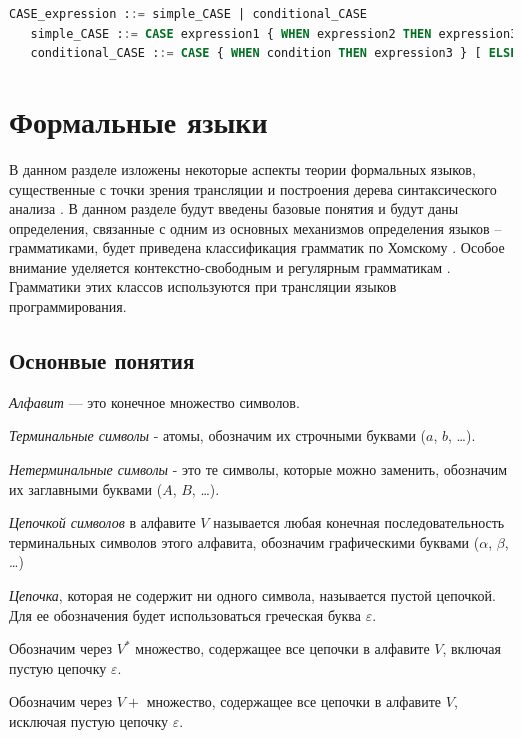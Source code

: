 \begin{lstlisting}[language=sql, label=some-code, caption=Спецификация SQL запроса]
   CASE_expression ::= simple_CASE | conditional_CASE
   simple_CASE ::= CASE expression1 { WHEN expression2 THEN expression3 } [ ELSE expression4 ] END
   conditional_CASE ::= CASE { WHEN condition THEN expression3 } [ ELSE expression4 ] END
\end{lstlisting}


\section{Формальные языки}

В данном разделе изложены некоторые аспекты теории формальных языков, существенные с точки зрения трансляции и построения дерева синтаксического анализа \cite{bib19}. 
В данном разделе будут введены базовые понятия и будут даны определения, связанные с одним из основных механизмов определения языков -- грамматиками, будет приведена
классификация грамматик по Хомскому \cite{bib20}.
Особое внимание уделяется контекстно-свободным и регулярным грамматикам \cite{bib21}. 
Грамматики этих классов используются при трансляции языков программирования. 

\subsection{Оснонвые понятия}

\textit{Алфавит} — это конечное множество символов.

\textit{Терминальные символы} - атомы, обозначим их строчными буквами ($a$, $b$, \dots).

\textit{Нетерминальные символы} -  это те символы, которые можно заменить, обозначим их заглавными буквами ($A$, $B$, \dots). 

\textit{Цепочкой символов} в алфавите $V$ называется любая конечная последовательность 
терминальных символов этого алфавита, обозначим графическими буквами ($\alpha$, $\beta$, \dots ) 

\textit{Цепочка}, которая не содержит ни одного символа, называется пустой цепочкой. 
Для ее обозначения будет использоваться греческая буква $\varepsilon$.

Обозначим через $V^{*}$ множество, содержащее все цепочки в алфавите
$V$, включая пустую цепочку $\varepsilon$.

Обозначим через $V{+}$ множество, содержащее все цепочки в алфавите $V$,
исключая пустую цепочку $\varepsilon$.

